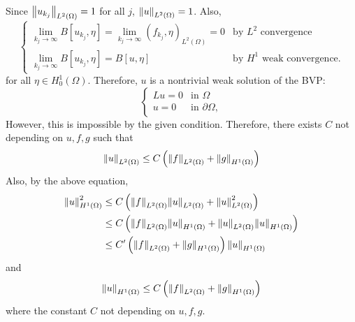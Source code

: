 \documentclass{article}
\begin{document}
Since $\norm{u_{k_j}}_{L^2(\Omega)}=1$ for all $j$, $\norm{u}_{L^2(\Omega)}=1$. Also,
\begin{equation*}
\begin{cases}
\lim\limits_{k_j\rightarrow \infty}B[u_{k_j},\eta]=\lim\limits_{k_j\rightarrow \infty}(f_{k_j},\eta)_{L^2(\Omega)}=0 & \text{by }L^2\text{ convergence} \\
\lim\limits_{k_j\rightarrow \infty}B[u_{k_j},\eta]=B[u,\eta] & \text{by }H^1\text{ weak convergence}.
\end{cases}
\end{equation*}
for all $\eta\in H^1_0(\Omega)$. Therefore, $u$ is a nontrivial weak solution of the BVP:
\begin{equation*}
\begin{cases}
Lu=0 & \text{in }\Omega \\
u=0 & \text{in }\partial \Omega,
\end{cases}
\end{equation*}
However, this is impossible by the given condition. Therefore, there exists $C$ not depending on $u, f, g$ such that
\begin{equation*}
\norm{u}_{L^2(\Omega)}\leq C\left(\norm{f}_{L^2(\Omega)}+\norm{g}_{H^1(\Omega)}\right)
\end{equation*}
Also, by the above equation,
\begin{equation*}
\begin{split}
\norm{u}^2_{H^1(\Omega)}&\leq C\left(\norm{f}_{L^2(\Omega)}\norm{u}_{L^2(\Omega)}+\norm{u}^2_{L^2(\Omega)}\right) \\
&\leq C\left(\norm{f}_{L^2(\Omega)}\norm{u}_{H^1(\Omega)}+\norm{u}_{L^2(\Omega)}\norm{u}_{H^1(\Omega)}\right) \\
&\leq C'\left(\norm{f}_{L^2(\Omega)}+\norm{g}_{H^1(\Omega)}\right)\norm{u}_{H^1(\Omega)}
\end{split}
\end{equation*}
and
\begin{equation*}
\norm{u}_{H^1(\Omega)}\leq C\left(\norm{f}_{L^2(\Omega)}+\norm{g}_{H^1(\Omega)}\right)
\end{equation*}
where the constant $C$ not depending on $u,f,g$.
\end{document}
